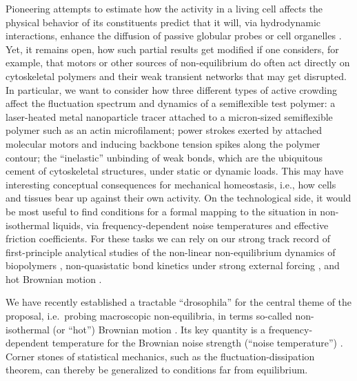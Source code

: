 \begin{workpackage}
\begin{tasklist}
\begin{task}[title=Active Crowding,id=task2,lead=Leipzig,wphases=0-48!0.5]
Pioneering attempts to estimate how the activity in a living cell affects the physical behavior
of its constituents predict that it will, via hydrodynamic interactions, enhance the diffusion of
passive globular probes or cell organelles \cite{mikhailov-kapral:2015}.
%
Yet, it remains open, how such partial results get modified if one considers, for example, that motors or
other sources of non-equilibrium do often act directly on cytoskeletal polymers and their
weak transient networks that may get disrupted.
%
In particular, we want to consider how three different types of active
crowding affect the fluctuation spectrum and dynamics of a semiflexible test polymer: a
laser-heated metal nanoparticle tracer attached to a micron-sized semiflexible polymer such
as an actin microfilament; power strokes exerted by attached molecular
motors and inducing backbone tension spikes along the polymer contour; the ``inelastic'' \cite{gralka-kroy:2015}
unbinding of weak bonds, which are the ubiquitous cement of
cytoskeletal structures, under static or dynamic loads.
%
This may have interesting conceptual consequences for mechanical homeostasis, i.e., how cells and tissues bear up against 
their own activity.   
%
On the technological side, it would be most useful to find conditions for a formal mapping to the situation in 
non-isothermal liquids, via frequency-dependent noise temperatures and effective friction coefficients.
%
For these tasks we can rely on our strong track record of first-principle analytical studies
of the non-linear non-equilibrium dynamics of biopolymers \cite{otto-etal:2013}, non-quasistatic bond kinetics
under strong external forcing \cite{bullerjahn-sturm-kroy:2014}, and hot Brownian motion \cite{rings-etal:2010}.

\end{task}


\begin{task}[title=Noise Temperature,id=task3,lead=Leipzig,wphases=0-24!0.5]
We have recently established a tractable ``drosophila'' for the central theme of the
proposal, i.e.\ probing macroscopic non-equilibria, in terms so-called non-isothermal (or
``hot'') Brownian motion \cite{rings-etal:2010,chakraborty-etal:2011}.
%
Its key quantity is a frequency-dependent
temperature for the Brownian noise strength (``noise temperature'') \cite{falasco-etal:2014}.
%
Corner stones of statistical mechanics, such as the fluctuation-dissipation theorem, can
thereby be generalized to conditions far from equilibrium.  


\end{task}
\end{tasklist}
\end{workpackage}
